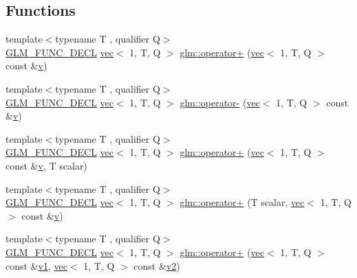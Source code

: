 \subsection*{Functions}
\begin{DoxyCompactItemize}
\item 
{\footnotesize template$<$typename T , qualifier Q$>$ }\\\mbox{\hyperlink{setup_8hpp_ab2d052de21a70539923e9bcbf6e83a51}{G\+L\+M\+\_\+\+F\+U\+N\+C\+\_\+\+D\+E\+CL}} \mbox{\hyperlink{structglm_1_1vec}{vec}}$<$ 1, T, Q $>$ \mbox{\hyperlink{group__ext__vec1_gac2cf4da0dc267f31db88de168ea3169b}{glm\+::operator+}} (\mbox{\hyperlink{structglm_1_1vec}{vec}}$<$ 1, T, Q $>$ const \&\mbox{\hyperlink{_s_d_l__opengl_8h_a10a82eabcb59d2fcd74acee063775f90}{v}})
\item 
{\footnotesize template$<$typename T , qualifier Q$>$ }\\\mbox{\hyperlink{setup_8hpp_ab2d052de21a70539923e9bcbf6e83a51}{G\+L\+M\+\_\+\+F\+U\+N\+C\+\_\+\+D\+E\+CL}} \mbox{\hyperlink{structglm_1_1vec}{vec}}$<$ 1, T, Q $>$ \mbox{\hyperlink{group__ext__vec1_gad2032db9362999ab1c27aae09816c9fd}{glm\+::operator-\/}} (\mbox{\hyperlink{structglm_1_1vec}{vec}}$<$ 1, T, Q $>$ const \&\mbox{\hyperlink{_s_d_l__opengl_8h_a10a82eabcb59d2fcd74acee063775f90}{v}})
\item 
{\footnotesize template$<$typename T , qualifier Q$>$ }\\\mbox{\hyperlink{setup_8hpp_ab2d052de21a70539923e9bcbf6e83a51}{G\+L\+M\+\_\+\+F\+U\+N\+C\+\_\+\+D\+E\+CL}} \mbox{\hyperlink{structglm_1_1vec}{vec}}$<$ 1, T, Q $>$ \mbox{\hyperlink{group__ext__vec1_ga00b4b51068bde0730a3ed9ebeb254a24}{glm\+::operator+}} (\mbox{\hyperlink{structglm_1_1vec}{vec}}$<$ 1, T, Q $>$ const \&\mbox{\hyperlink{_s_d_l__opengl_8h_a10a82eabcb59d2fcd74acee063775f90}{v}}, T scalar)
\item 
{\footnotesize template$<$typename T , qualifier Q$>$ }\\\mbox{\hyperlink{setup_8hpp_ab2d052de21a70539923e9bcbf6e83a51}{G\+L\+M\+\_\+\+F\+U\+N\+C\+\_\+\+D\+E\+CL}} \mbox{\hyperlink{structglm_1_1vec}{vec}}$<$ 1, T, Q $>$ \mbox{\hyperlink{group__ext__vec1_ga9ce1879778cf852a8e5853db26138110}{glm\+::operator+}} (T scalar, \mbox{\hyperlink{structglm_1_1vec}{vec}}$<$ 1, T, Q $>$ const \&\mbox{\hyperlink{_s_d_l__opengl_8h_a10a82eabcb59d2fcd74acee063775f90}{v}})
\item 
{\footnotesize template$<$typename T , qualifier Q$>$ }\\\mbox{\hyperlink{setup_8hpp_ab2d052de21a70539923e9bcbf6e83a51}{G\+L\+M\+\_\+\+F\+U\+N\+C\+\_\+\+D\+E\+CL}} \mbox{\hyperlink{structglm_1_1vec}{vec}}$<$ 1, T, Q $>$ \mbox{\hyperlink{group__ext__vec1_gadbe612a85d5c9d06f29d726d7998a8db}{glm\+::operator+}} (\mbox{\hyperlink{structglm_1_1vec}{vec}}$<$ 1, T, Q $>$ const \&\mbox{\hyperlink{_s_d_l__opengl__glext_8h_a435c176a02c061b43e19bdf7c86cceae}{v1}}, \mbox{\hyperlink{structglm_1_1vec}{vec}}$<$ 1, T, Q $>$ const \&\mbox{\hyperlink{_s_d_l__opengl__glext_8h_a0928f6d0f0f794ba000a21dfae422136}{v2}})

\end{DoxyCompactItemize}
